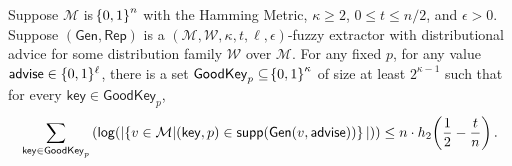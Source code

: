 \begin{lemma}
    \label{lem:smallgeneralviable}
    Suppose $\mathcal{M}$ is $\!\left\{ 0,1 \right\}^{n}$ with the Hamming Metric, $\kappa \geq 2$, $0 \leq t \leq n/2$, and $\epsilon > 0$. 
    Suppose $(\mathsf{Gen, Rep})$ is a $(\mathcal{M,W},\kappa, t, \ell, \epsilon)$-fuzzy extractor with distributional advice for some distribution family $\mathcal{W}$ over $\mathcal{M}$. 
    For any fixed $p$, for any value ${\mathsf{advise}} \in \{0, 1\}^\ell$, there is a set $\mathsf{GoodKey}_p \subseteq \!\left\{ 0,1 \right\}^{\kappa}$ of size at least $2^{\kappa - 1}$ such that for every $\mathsf{key} \in \mathsf{GoodKey}_p$,
    \[
       \sum_{\mathsf{key} \in \mathsf{GoodKey}_p} \left( \mathsf{log}\!\left(|\!\left\{ v \in \mathcal{M}|\!\left(\mathsf{key}, p\right) \in \mathsf{supp}\!\left(\mathsf{Gen}(v, {\mathsf{advise}})\right) \right\}|\right)\right) \leq n \cdot h_2\!\left(\frac{1}{2} - \frac{t}{n}\right).
    \]   
\end{lemma}



